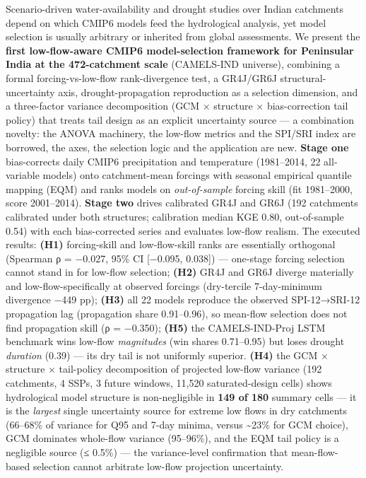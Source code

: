 \documentclass[
  english,
  11pt,
]{article}
\begin{document}
Scenario-driven water-availability and drought studies over Indian
catchments depend on which CMIP6 models feed the hydrological analysis,
yet model selection is usually arbitrary or inherited from global
assessments. We present the \textbf{first low-flow-aware CMIP6
model-selection framework for Peninsular India at the 472-catchment
scale} (CAMELS-IND universe), combining a formal forcing-vs-low-flow
rank-divergence test, a GR4J/GR6J structural-uncertainty axis,
drought-propagation reproduction as a selection dimension, and a
three-factor variance decomposition (GCM × structure × bias-correction
tail policy) that treats tail design as an explicit uncertainty source
--- a combination novelty: the ANOVA machinery, the low-flow metrics and
the SPI/SRI index are borrowed, the axes, the selection logic and the
application are new. \textbf{Stage one} bias-corrects daily CMIP6
precipitation and temperature (1981--2014, 22 all-variable models) onto
catchment-mean forcings with seasonal empirical quantile mapping (EQM)
and ranks models on \emph{out-of-sample} forcing skill (fit 1981--2000,
score 2001--2014). \textbf{Stage two} drives calibrated GR4J and GR6J
(192 catchments calibrated under both structures; calibration median KGE
0.80, out-of-sample 0.54) with each bias-corrected series and evaluates
low-flow realism. The executed results: \textbf{(H1)} forcing-skill and
low-flow-skill ranks are essentially orthogonal (Spearman ρ = −0.027,
95\% CI {[}−0.095, 0.038{]}) --- one-stage forcing selection cannot
stand in for low-flow selection; \textbf{(H2)} GR4J and GR6J diverge
materially and low-flow-specifically at observed forcings (dry-tercile
7-day-minimum divergence −449 pp); \textbf{(H3)} all 22 models reproduce
the observed SPI-12→SRI-12 propagation lag (propagation share
0.91--0.96), so mean-flow selection does not find propagation skill (ρ =
−0.350); \textbf{(H5)} the CAMELS-IND-Proj LSTM benchmark wins low-flow
\emph{magnitudes} (win shares 0.71--0.95) but loses drought
\emph{duration} (0.39) --- its dry tail is not uniformly superior.
\textbf{(H4)} the GCM × structure × tail-policy decomposition of
projected low-flow variance (192 catchments, 4 SSPs, 3 future windows,
11,520 saturated-design cells) shows hydrological model structure is
non-negligible in \textbf{149 of 180} summary cells --- it is the
\emph{largest} single uncertainty source for extreme low flows in dry
catchments (66--68\% of variance for Q95 and 7-day minima, versus
\textasciitilde23\% for GCM choice), GCM dominates whole-flow variance
(95--96\%), and the EQM tail policy is a negligible source (≤ 0.5\%) ---
the variance-level confirmation that mean-flow-based selection cannot
arbitrate low-flow projection uncertainty.
\end{document}
